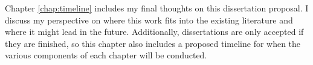 

Chapter \ref{chap:timeline} includes my final thoughts on this dissertation proposal. 
I discuss my perspective on where this work fits into the existing literature and where it might lead in the future.
Additionally, dissertations are only accepted if they are finished, %
so this chapter also includes a proposed timeline for when the various components of each chapter will be conducted.

